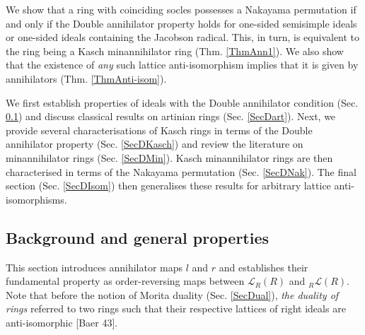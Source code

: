 \documentclass[11pt]{article}
\theoremstyle{plain}
\theoremstyle{remark}
\theoremstyle{plain}
\begin{document}
We show that a ring with coinciding socles possesses a Nakayama permutation if and only if the Double annihilator property holds for one-sided semisimple ideals or one-sided ideals containing the Jacobson radical. This, in turn, is equivalent to the ring being a Kasch minannihilator ring (Thm. \ref{ThmAnn1}).  We also show that the existence of \textit{any} such lattice anti-isomorphism implies that it is given by annihilators (Thm. \ref{ThmAnti-isom}).

\smallskip 

We first establish properties of ideals with the Double annihilator condition (Sec. \ref{SecDIntro}) and discuss classical results on artinian rings (Sec. \ref{SecDart}). Next, we provide several characterisations of Kasch rings in terms of the Double annihilator property (Sec. \ref{SecDKasch}) and review the literature on minannihilator rings (Sec. \ref{SecDMin}).  Kasch minannihilator rings are then characterised in terms of the Nakayama permutation (Sec. \ref{SecDNak}). The final section  (Sec. \ref{SecDIsom}) then generalises these results for arbitrary lattice anti-isomorphisms.



\subsection{Background and general properties}\label{SecDIntro}

This section introduces annihilator maps $l$ and $r$ and establishes their fundamental property as order-reversing maps between $\mathcal{L}_R(R)$ and $_R\mathcal{L}(R)$. Note that before the notion of Morita duality (Sec. \ref{SecDual}), \textit{the duality of rings} referred to two rings such that their respective lattices of right ideals are anti-isomorphic [Baer 43].
\end{document}

